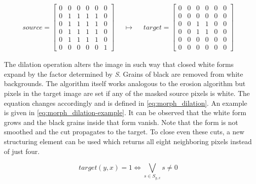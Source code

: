 \documentclass{report}
\begin{document}
\begin{align}\label{eq:morph_erosion-example}
  source = \begin{bmatrix}
    0 & 0 & 0 & 0 & 0 & 0 \\
    0 & 1 & 1 & 1 & 1 & 0 \\
    0 & 1 & 1 & 1 & 1 & 0 \\
    0 & 1 & 1 & 1 & 1 & 0 \\
    0 & 1 & 1 & 1 & 1 & 0 \\
    0 & 0 & 0 & 0 & 0 & 1
  \end{bmatrix}
  & &
  \mapsto
  & &
  target = \begin{bmatrix}
    0 & 0 & 0 & 0 & 0 & 0 \\
    0 & 0 & 0 & 0 & 0 & 0 \\
    0 & 0 & 1 & 1 & 0 & 0 \\
    0 & 0 & 1 & 1 & 0 & 0 \\
    0 & 0 & 0 & 0 & 0 & 0 \\
    0 & 0 & 0 & 0 & 0 & 0
  \end{bmatrix}
\end{align}

The dilation operation alters the image in such way that closed white
forms expand by the factor determined by \textit{S}. Grains of black
are removed from white backgrounds. The algorithm itself works
analogous to the erosion algorithm but pixels in the target image are
set if any of the masked source pixels is white. The equation changes
accordingly and is defined in \ref{eq:morph_dilation}. An example is
given in \ref{eq:morph_dilation-example}. It can be observed that the
white form grows and the black grains inside that form vanish. Note
that the form is not smoothed and the cut propagates to the target. To
close even these cuts, a new structuring element can be used which
returns all eight neighboring pixels instead of just four.

\begin{equation}\label{eq:morph_dilation}
  target(y, x) = 1 \iff \bigvee_{s \in S_{y, x}} s \neq 0
\end{equation}
\end{document}
